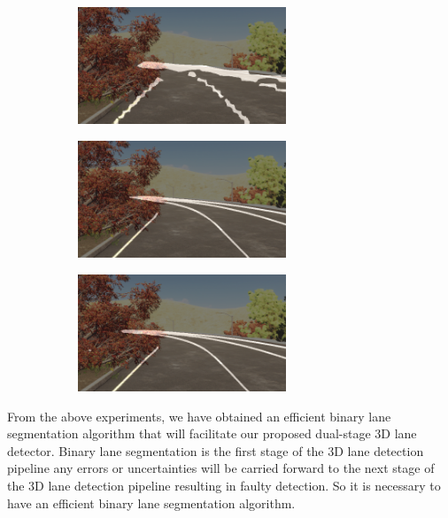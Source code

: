        \begin{figure}[h]
      \caption{Qualitative results for binary lane segmentation trained on sim3d dataset \cite{guo2020gen} for all the lanes present in the scene: (a) SCNN(Res18+Focal Loss) \cite{pan2018SCNN} (b) RESA(Res18+Dice Loss) \cite{DBLP:journals/corr/abs-2008-13719} (c)RESA(Res18+Focal Loss) \cite{DBLP:journals/corr/abs-2008-13719}}
        \centering
        \begin{subfigure}{0.4\textwidth}
        \includegraphics[width=1\linewidth, height=3.5cm]{images/full_res18_scnn_focal.png} 
        \caption{}
        \label{fig:subim1}
        \end{subfigure}
        \begin{subfigure}{0.4\textwidth}
        \includegraphics[width=1\linewidth,height=3.5cm]{images/Resa_r18_full_dice.png}
        \caption{}
        \label{fig:subim2}
        \end{subfigure}
        \begin{subfigure}{0.4\textwidth}
        \includegraphics[width=1\linewidth, height=3.5cm]{images/Resa_r50_full_dice.png}
        \caption{}
        \label{fig:subim2}
        \end{subfigure}
        \label{fig:image2}
        \end{figure}
        
     From the above experiments, we have obtained an efficient binary lane segmentation algorithm that will facilitate our proposed dual-stage 3D lane detector. Binary lane segmentation is the first stage of the 3D lane detection pipeline any errors or uncertainties will be carried forward to the next stage of the 3D lane detection pipeline resulting in faulty detection. So it is necessary to have an efficient binary lane segmentation algorithm. 
    

